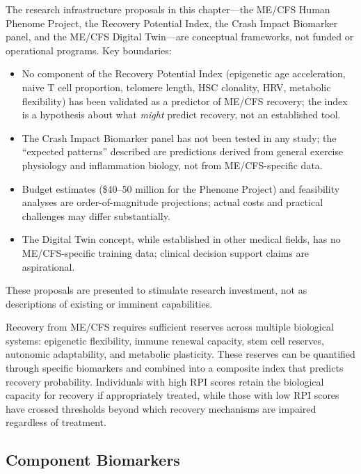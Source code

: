 \begin{limitation}
The research infrastructure proposals in this chapter---the ME/CFS Human Phenome Project, the Recovery Potential Index, the Crash Impact Biomarker panel, and the ME/CFS Digital Twin---are conceptual frameworks, not funded or operational programs. Key boundaries:
\begin{itemize}
    \item No component of the Recovery Potential Index (epigenetic age acceleration, naive T cell proportion, telomere length, HSC clonality, HRV, metabolic flexibility) has been validated as a predictor of ME/CFS recovery; the index is a hypothesis about what \emph{might} predict recovery, not an established tool.
    \item The Crash Impact Biomarker panel has not been tested in any study; the ``expected patterns'' described are predictions derived from general exercise physiology and inflammation biology, not from ME/CFS-specific data.
    \item Budget estimates (\$40--50 million for the Phenome Project) and feasibility analyses are order-of-magnitude projections; actual costs and practical challenges may differ substantially.
    \item The Digital Twin concept, while established in other medical fields, has no ME/CFS-specific training data; clinical decision support claims are aspirational.
\end{itemize}
These proposals are presented to stimulate research investment, not as descriptions of existing or imminent capabilities.
\end{limitation}

\begin{hypothesis}
\label{hyp:rpi}
Recovery from ME/CFS requires sufficient reserves across multiple biological systems: epigenetic flexibility, immune renewal capacity, stem cell reserves, autonomic adaptability, and metabolic plasticity. These reserves can be quantified through specific biomarkers and combined into a composite index that predicts recovery probability. Individuals with high RPI scores retain the biological capacity for recovery if appropriately treated, while those with low RPI scores have crossed thresholds beyond which recovery mechanisms are impaired regardless of treatment.
\end{hypothesis}

\subsection{Component Biomarkers}

